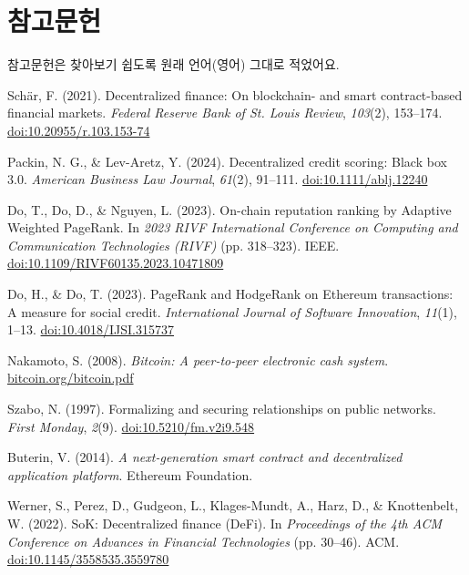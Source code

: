 \clearpage
\chapter{참고문헌}
\label{ch:references}

참고문헌은 찾아보기 쉽도록 원래 언어(영어) 그대로 적었어요.

\begin{enumerate}[label={[\arabic*]}, leftmargin=*, itemsep=0.35em, parsep=0pt]
  \item{}\label{ref:1} Sch\"{a}r, F. (2021). Decentralized finance: On blockchain- and smart contract-based financial markets. \textit{Federal Reserve Bank of St. Louis Review}, \textit{103}(2), 153--174. \href{https://doi.org/10.20955/r.103.153-74}{doi:10.20955/r.103.153-74}
  \item{}\label{ref:2} Packin, N. G., \& Lev-Aretz, Y. (2024). Decentralized credit scoring: Black box 3.0. \textit{American Business Law Journal}, \textit{61}(2), 91--111. \href{https://doi.org/10.1111/ablj.12240}{doi:10.1111/ablj.12240}
  \item{}\label{ref:3} Do, T., Do, D., \& Nguyen, L. (2023). On-chain reputation ranking by Adaptive Weighted PageRank. In \textit{2023 RIVF International Conference on Computing and Communication Technologies (RIVF)} (pp. 318--323). IEEE. \href{https://doi.org/10.1109/RIVF60135.2023.10471809}{doi:10.1109/RIVF60135.2023.10471809}
  \item{}\label{ref:4} Do, H., \& Do, T. (2023). PageRank and HodgeRank on Ethereum transactions: A measure for social credit. \textit{International Journal of Software Innovation}, \textit{11}(1), 1--13. \href{https://doi.org/10.4018/IJSI.315737}{doi:10.4018/IJSI.315737}
  \item{}\label{ref:5} Nakamoto, S. (2008). \textit{Bitcoin: A peer-to-peer electronic cash system}. \href{https://bitcoin.org/bitcoin.pdf}{bitcoin.org/bitcoin.pdf}
  \item{}\label{ref:6} Szabo, N. (1997). Formalizing and securing relationships on public networks. \textit{First Monday}, \textit{2}(9). \href{https://doi.org/10.5210/fm.v2i9.548}{doi:10.5210/fm.v2i9.548}
  \item{}\label{ref:7} Buterin, V. (2014). \textit{A next-generation smart contract and decentralized application platform}. Ethereum Foundation.
  \item{}\label{ref:8} Werner, S., Perez, D., Gudgeon, L., Klages-Mundt, A., Harz, D., \& Knottenbelt, W. (2022). SoK: Decentralized finance (DeFi). In \textit{Proceedings of the 4th ACM Conference on Advances in Financial Technologies} (pp. 30--46). ACM. \href{https://doi.org/10.1145/3558535.3559780}{doi:10.1145/3558535.3559780}

\end{enumerate}
